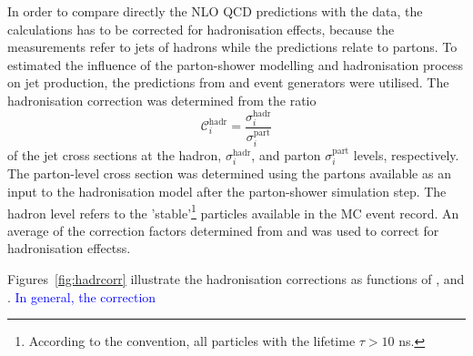 In order to compare directly the NLO QCD predictions with the data, the calculations has to be corrected for hadronisation effects, because the measurements refer to jets of hadrons while the predictions relate to partons. To estimated the influence of the parton-shower modelling and hadronisation process on jet production, the predictions from \ariadne and \lepto event generators were utilised. The hadronisation correction was determined from the ratio 
\begin{equation}
 \mathcal{C}^\text{hadr}_i = \frac{\sigma_i^\text{hadr}}{\sigma_i^\text{part}}
 \label{eq:hadrcor}
\end{equation}
of the jet cross sections at the hadron, $\sigma_i^\text{hadr}$, and parton $\sigma_i^\text{part}$ levels, respectively. The parton-level cross section was determined using the partons available as an input to the hadronisation model after the parton-shower simulation step. The hadron level refers to the 'stable'\footnote{According to the \zeus convention, all particles with the lifetime $\tau > 10$ ns.} particles available in the MC event record. An average of the correction factors determined from \ariadne and \lepto was used to correct for hadronisation effectss.

Figures~\ref{fig:hadrcorr} illustrate the hadronisation corrections as functions of \etjetb, \etajetb and \qsq. \textcolor{blue}{In general, the correction}



